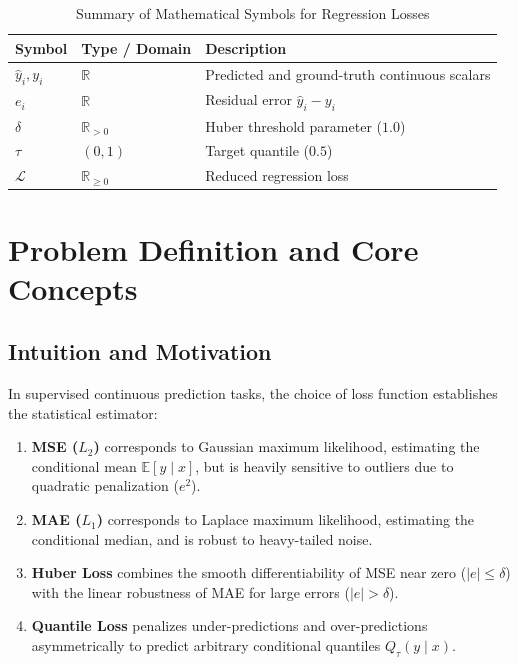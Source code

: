 \documentclass[11pt,a4paper]{article}
\theoremstyle{definition}
\begin{document}
\begin{table}[h]
\centering
\caption{Summary of Mathematical Symbols for Regression Losses}
\begin{tabular}{lll}
\toprule
\textbf{Symbol} & \textbf{Type / Domain} & \textbf{Description} \\
\midrule
$\hat{y}_i, y_i$ & $\mathbb{R}$ & Predicted and ground-truth continuous scalars \\
$e_i$ & $\mathbb{R}$ & Residual error $\hat{y}_i - y_i$ \\
$\delta$ & $\mathbb{R}_{> 0}$ & Huber threshold parameter ($1.0$) \\
$\tau$ & $(0, 1)$ & Target quantile ($0.5$) \\
$\mathcal{L}$ & $\mathbb{R}_{\ge 0}$ & Reduced regression loss \\
\bottomrule
\end{tabular}
\end{table}

\section{Problem Definition and Core Concepts}

\subsection{Intuition and Motivation}
In supervised continuous prediction tasks, the choice of loss function establishes the statistical estimator:
\begin{enumerate}
    \item \textbf{MSE ($L_2$)} corresponds to Gaussian maximum likelihood, estimating the conditional mean $\mathbb{E}[y \mid x]$, but is heavily sensitive to outliers due to quadratic penalization ($e^2$).
    \item \textbf{MAE ($L_1$)} corresponds to Laplace maximum likelihood, estimating the conditional median, and is robust to heavy-tailed noise.
    \item \textbf{Huber Loss} combines the smooth differentiability of MSE near zero ($|e| \le \delta$) with the linear robustness of MAE for large errors ($|e| > \delta$).
    \item \textbf{Quantile Loss} penalizes under-predictions and over-predictions asymmetrically to predict arbitrary conditional quantiles $Q_\tau(y \mid x)$.
\end{enumerate}
\end{document}
